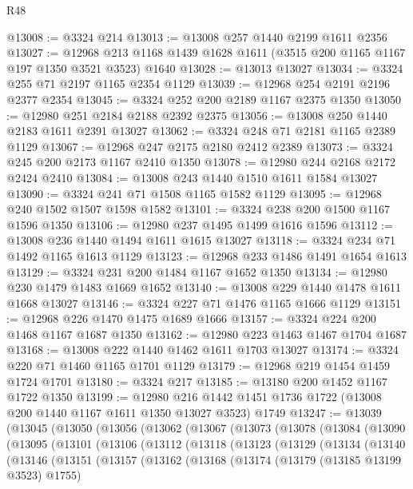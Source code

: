 \begin{lexlean}{R48}
\begin{coremodule}
@13008 := @3324 @214
@13013 := @13008 @257 @1440 @2199 @1611 @2356
@13027 := @12968 @213 @1168 @1439 @1628 @1611 (@3515 @200 @1165 @1167 @197 @1350 @3521 @3523) @1640
@13028 := @13013 @13027
@13034 := @3324 @255 @71 @2197 @1165 @2354 @1129
@13039 := @12968 @254 @2191 @2196 @2377 @2354
@13045 := @3324 @252 @200 @2189 @1167 @2375 @1350
@13050 := @12980 @251 @2184 @2188 @2392 @2375
@13056 := @13008 @250 @1440 @2183 @1611 @2391 @13027
@13062 := @3324 @248 @71 @2181 @1165 @2389 @1129
@13067 := @12968 @247 @2175 @2180 @2412 @2389
@13073 := @3324 @245 @200 @2173 @1167 @2410 @1350
@13078 := @12980 @244 @2168 @2172 @2424 @2410
@13084 := @13008 @243 @1440 @1510 @1611 @1584 @13027
@13090 := @3324 @241 @71 @1508 @1165 @1582 @1129
@13095 := @12968 @240 @1502 @1507 @1598 @1582
@13101 := @3324 @238 @200 @1500 @1167 @1596 @1350
@13106 := @12980 @237 @1495 @1499 @1616 @1596
@13112 := @13008 @236 @1440 @1494 @1611 @1615 @13027
@13118 := @3324 @234 @71 @1492 @1165 @1613 @1129
@13123 := @12968 @233 @1486 @1491 @1654 @1613
@13129 := @3324 @231 @200 @1484 @1167 @1652 @1350
@13134 := @12980 @230 @1479 @1483 @1669 @1652
@13140 := @13008 @229 @1440 @1478 @1611 @1668 @13027
@13146 := @3324 @227 @71 @1476 @1165 @1666 @1129
@13151 := @12968 @226 @1470 @1475 @1689 @1666
@13157 := @3324 @224 @200 @1468 @1167 @1687 @1350
@13162 := @12980 @223 @1463 @1467 @1704 @1687
@13168 := @13008 @222 @1440 @1462 @1611 @1703 @13027
@13174 := @3324 @220 @71 @1460 @1165 @1701 @1129
@13179 := @12968 @219 @1454 @1459 @1724 @1701
@13180 := @3324 @217
@13185 := @13180 @200 @1452 @1167 @1722 @1350
@13199 := @12980
    @216
    @1442
    @1451
    @1736
    @1722
    (@13008 @200 @1440 @1167 @1611 @1350 @13027 @3523)
    @1749
@13247 := @13039
    (@13045
      (@13050
        (@13056
          (@13062
            (@13067
              (@13073
                (@13078
                  (@13084
                    (@13090
                      (@13095
                        (@13101
                          (@13106
                            (@13112
                              (@13118
                                (@13123
                                  (@13129
                                    (@13134
                                      (@13140
                                        (@13146
                                          (@13151
                                            (@13157
                                              (@13162
                                                (@13168
                                                  (@13174
                                                    (@13179 (@13185 @13199 @3523) @1755)

\end{coremodule}
\end{lexlean}
